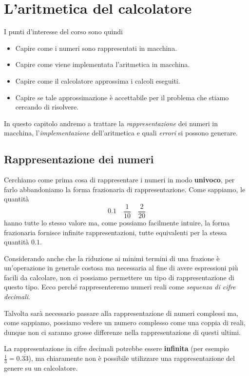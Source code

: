 \chapter{L'aritmetica del calcolatore}
I punti d'interesse del corso sono quindi
\begin{itemize}
	\item Capire come i numeri sono rappresentati in macchina.
	\item Capire come viene implementata l'aritmetica in macchina.
	\item Capire come il calcolatore approssima i calcoli eseguiti.
	\item Capire se tale approssimazione è accettabile per il problema che stiamo cercando di risolvere.
\end{itemize}
In questo capitolo andremo a trattare la \emph{rappresentazione} dei numeri in macchina, l'\emph{implementazione}
dell'aritmetica e quali \emph{errori} si possono generare.

\section{Rappresentazione dei numeri}
Cerchiamo come prima cosa di rappresentare i numeri in modo \textbf{univoco}, per farlo abbandoniamo la forma
frazionaria di rappresentazione. Come sappiamo, le quantità
\[ 0.1 \quad \frac{1}{10} \quad \frac{2}{20} \]
hanno tutte lo stesso valore ma, come possiamo facilmente intuire, la forma frazionaria fornisce infinite
rappresentazioni, tutte equivalenti per la stessa quantità $0.1$.

Considerando anche che la riduzione ai minimi termini di una frazione è un'operazione in generale costosa ma
necessaria al fine di avere espressioni più facili da calcolare, non ci possiamo permettere un tipo di
rappresentazione di questo tipo. Ecco perché rappresenteremo numeri reali come \emph{sequenza di cifre decimali}.

\begin{observation}
	Talvolta sarà necessario passare alla rappresentazione di numeri complessi ma, come sappiamo, possiamo vedere
	un numero complesso come una coppia di reali, dunque non ci saranno grosse differenze nella rappresentazione
	di questi ultimi.
\end{observation}

\begin{observation}
	La rappresentazione in cifre decimali potrebbe essere \textbf{infinita} (per esempio
	$\frac{1}{3} = 0.\overline{33}$), ma chiaramente non è possibile utilizzare una rappresentazione del genere
	su un calcolatore.
\end{observation}

